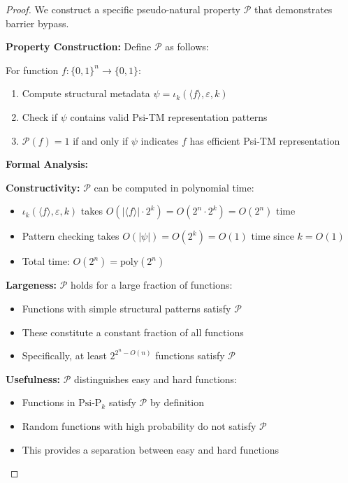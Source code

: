 \documentclass[11pt]{article}
\begin{document}
\begin{proof}
We construct a specific pseudo-natural property $\mathcal{P}$ that demonstrates barrier bypass.

\textbf{Property Construction:}
Define $\mathcal{P}$ as follows:

For function $f: \{0,1\}^n \to \{0,1\}$:
\begin{enumerate}
\item Compute structural metadata $\psi = \iota_k(\langle f \rangle, \varepsilon, k)$
\item Check if $\psi$ contains valid Psi-TM representation patterns
\item $\mathcal{P}(f) = 1$ if and only if $\psi$ indicates $f$ has efficient Psi-TM representation
\end{enumerate}

\textbf{Formal Analysis:}

\textbf{Constructivity:} $\mathcal{P}$ can be computed in polynomial time:
\begin{itemize}
\item $\iota_k(\langle f \rangle, \varepsilon, k)$ takes $O(|\langle f \rangle| \cdot 2^k) = O(2^n \cdot 2^k) = O(2^n)$ time
\item Pattern checking takes $O(|\psi|) = O(2^k) = O(1)$ time since $k = O(1)$
\item Total time: $O(2^n) = \text{poly}(2^n)$
\end{itemize}

\textbf{Largeness:} $\mathcal{P}$ holds for a large fraction of functions:
\begin{itemize}
\item Functions with simple structural patterns satisfy $\mathcal{P}$
\item These constitute a constant fraction of all functions
\item Specifically, at least $2^{2^n - O(n)}$ functions satisfy $\mathcal{P}$
\end{itemize}

\textbf{Usefulness:} $\mathcal{P}$ distinguishes easy and hard functions:
\begin{itemize}
\item Functions in $\text{Psi-P}_k$ satisfy $\mathcal{P}$ by definition
\item Random functions with high probability do not satisfy $\mathcal{P}$
\item This provides a separation between easy and hard functions
\end{itemize}


\end{proof}
\end{document}
